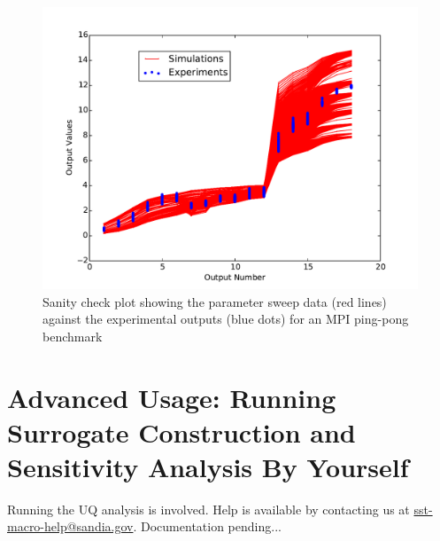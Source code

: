 \begin{figure}
\includegraphics{figures/uqSanity.pdf}
\caption{Sanity check plot showing the parameter sweep data (red lines) against the experimental outputs (blue dots) for an MPI ping-pong benchmark}
\label{fig:uqSanityCheck}
\end{figure}

\section{Advanced Usage: Running Surrogate Construction and Sensitivity Analysis By Yourself}
Running the UQ analysis is involved. Help is available by contacting us at \url{sst-macro-help@sandia.gov}.
Documentation pending...


